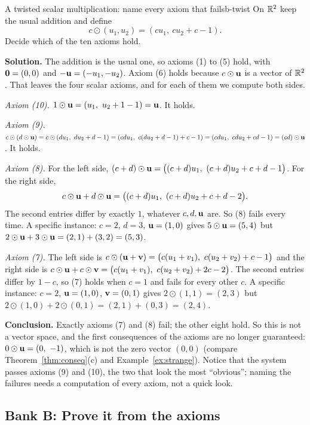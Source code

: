 \documentclass[11pt]{article}
\begin{document}
\begin{exmp}{A twisted scalar multiplication: name every axiom that fails}{b-twist}
On $\mathbb{R}^2$ keep the usual addition and define
\[
c\odot(u_1,u_2)=(cu_1,\ cu_2+c-1).
\]
Decide which of the ten axioms hold.

\textbf{Solution.} The addition is the usual one, so axioms (1) to (5) hold, with $\mathbf{0}=(0,0)$ and $-\mathbf{u}=(-u_1,-u_2)$. Axiom (6) holds because $c\odot\mathbf{u}$ is a vector of $\mathbb{R}^2$. That leaves the four scalar axioms, and for each of them we compute both sides.

\emph{Axiom (10).} $1\odot\bv{u}=(u_1,\ u_2+1-1)=\bv{u}$. It holds.

\emph{Axiom (9).} $c\odot(d\odot\bv{u})=c\odot(du_1,\ du_2+d-1)=(cdu_1,\ c(du_2+d-1)+c-1)=(cdu_1,\ cdu_2+cd-1)=(cd)\odot\bv{u}$. It holds.

\emph{Axiom (8).} For the left side, $(c+d)\odot\bv{u}=\bigl((c+d)u_1,\ (c+d)u_2+c+d-1\bigr)$. For the right side,
\[
c\odot\bv{u}+d\odot\bv{u}=\bigl((c+d)u_1,\ (c+d)u_2+c+d-2\bigr).
\]
The second entries differ by exactly $1$, whatever $c,d,\mathbf{u}$ are. So (8) fails every time. A specific instance: $c=2$, $d=3$, $\mathbf{u}=(1,0)$ gives $5\odot\mathbf{u}=(5,4)$ but $2\odot\mathbf{u}+3\odot\mathbf{u}=(2,1)+(3,2)=(5,3)$.

\emph{Axiom (7).} The left side is $c\odot(\bv{u}+\bv{v})=\bigl(c(u_1+v_1),\ c(u_2+v_2)+c-1\bigr)$ and the right side is $c\odot\bv{u}+c\odot\bv{v}=\bigl(c(u_1+v_1),\ c(u_2+v_2)+2c-2\bigr)$. The second entries differ by $1-c$, so (7) holds when $c=1$ and fails for every other $c$. A specific instance: $c=2$, $\mathbf{u}=(1,0)$, $\mathbf{v}=(0,1)$ gives $2\odot(1,1)=(2,3)$ but $2\odot(1,0)+2\odot(0,1)=(2,1)+(0,3)=(2,4)$.

\textbf{Conclusion.} Exactly axioms (7) and (8) fail; the other eight hold. So this is not a vector space, and the first consequences of the axioms are no longer guaranteed: $0\odot\mathbf{u}=(0,\ -1)$, which is not the zero vector $(0,0)$ (compare Theorem~\ref{thm:conseq}(c) and Example~\ref{ex:strange}). Notice that the system passes axioms (9) and (10), the two that look the most ``obvious''; naming the failures needs a computation of every axiom, not a quick look.
\end{exmp}

\subsection*{Bank B: Prove it from the axioms}
\end{document}
